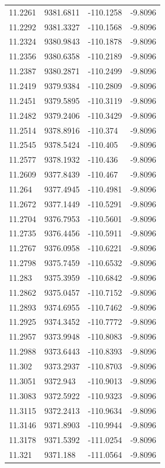\begin{table}[H]
\begin{tabular}{llll}
11.2261 & 9381.6811 & -110.1258 & -9.8096 \\
11.2292 & 9381.3327 & -110.1568 & -9.8096 \\
11.2324 & 9380.9843 & -110.1878 & -9.8096 \\
11.2356 & 9380.6358 & -110.2189 & -9.8096 \\
11.2387 & 9380.2871 & -110.2499 & -9.8096 \\
11.2419 & 9379.9384 & -110.2809 & -9.8096 \\
11.2451 & 9379.5895 & -110.3119 & -9.8096 \\
11.2482 & 9379.2406 & -110.3429 & -9.8096 \\
11.2514 & 9378.8916 & -110.374 & -9.8096 \\
11.2545 & 9378.5424 & -110.405 & -9.8096 \\
11.2577 & 9378.1932 & -110.436 & -9.8096 \\
11.2609 & 9377.8439 & -110.467 & -9.8096 \\
11.264 & 9377.4945 & -110.4981 & -9.8096 \\
11.2672 & 9377.1449 & -110.5291 & -9.8096 \\
11.2704 & 9376.7953 & -110.5601 & -9.8096 \\
11.2735 & 9376.4456 & -110.5911 & -9.8096 \\
11.2767 & 9376.0958 & -110.6221 & -9.8096 \\
11.2798 & 9375.7459 & -110.6532 & -9.8096 \\
11.283 & 9375.3959 & -110.6842 & -9.8096 \\
11.2862 & 9375.0457 & -110.7152 & -9.8096 \\
11.2893 & 9374.6955 & -110.7462 & -9.8096 \\
11.2925 & 9374.3452 & -110.7772 & -9.8096 \\
11.2957 & 9373.9948 & -110.8083 & -9.8096 \\
11.2988 & 9373.6443 & -110.8393 & -9.8096 \\
11.302 & 9373.2937 & -110.8703 & -9.8096 \\
11.3051 & 9372.943 & -110.9013 & -9.8096 \\
11.3083 & 9372.5922 & -110.9323 & -9.8096 \\
11.3115 & 9372.2413 & -110.9634 & -9.8096 \\
11.3146 & 9371.8903 & -110.9944 & -9.8096 \\
11.3178 & 9371.5392 & -111.0254 & -9.8096 \\
11.321 & 9371.188 & -111.0564 & -9.8096 \\

\end{tabular}
\end{table}
